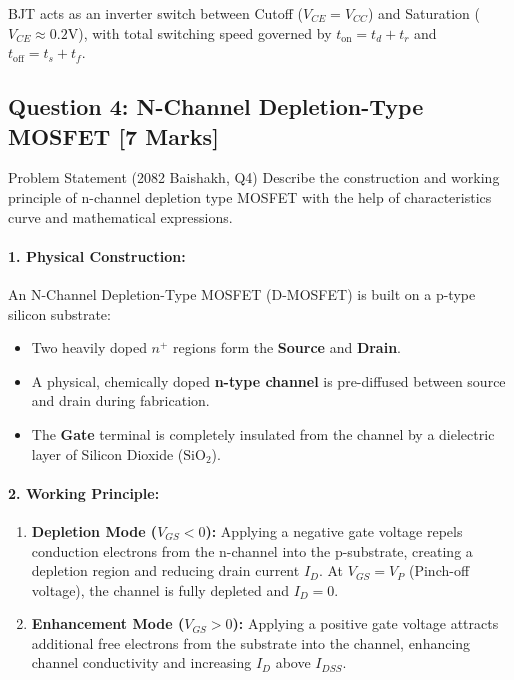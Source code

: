 \documentclass[11pt,a4paper,oneside]{book}
\begin{document}
\begin{answerbox}
BJT acts as an inverter switch between Cutoff ($V_{CE}=V_{CC}$) and Saturation ($V_{CE}\approx 0.2\text{V}$), with total switching speed governed by $t_{\text{on}} = t_d + t_r$ and $t_{\text{off}} = t_s + t_f$.
\end{answerbox}

\vspace{0.6cm}

\subsection{Question 4: N-Channel Depletion-Type MOSFET [7 Marks]}
\begin{questionbox}{Problem Statement (2082 Baishakh, Q4)}
Describe the construction and working principle of n-channel depletion type MOSFET with the help of characteristics curve and mathematical expressions.
\end{questionbox}

\paragraph{1. Physical Construction:}
An N-Channel Depletion-Type MOSFET (D-MOSFET) is built on a p-type silicon substrate:
\begin{itemize}[leftmargin=1.5em]
  \item Two heavily doped $n^+$ regions form the \textbf{Source} and \textbf{Drain}.
  \item A physical, chemically doped \textbf{n-type channel} is pre-diffused between source and drain during fabrication.
  \item The \textbf{Gate} terminal is completely insulated from the channel by a dielectric layer of Silicon Dioxide ($\text{SiO}_2$).
\end{itemize}

\paragraph{2. Working Principle:}
\begin{enumerate}[leftmargin=1.5em]
  \item \textbf{Depletion Mode ($V_{GS} < 0$):} Applying a negative gate voltage repels conduction electrons from the n-channel into the p-substrate, creating a depletion region and reducing drain current $I_D$. At $V_{GS} = V_P$ (Pinch-off voltage), the channel is fully depleted and $I_D = 0$.
  \item \textbf{Enhancement Mode ($V_{GS} > 0$):} Applying a positive gate voltage attracts additional free electrons from the substrate into the channel, enhancing channel conductivity and increasing $I_D$ above $I_{DSS}$.
\end{enumerate}
\end{document}
